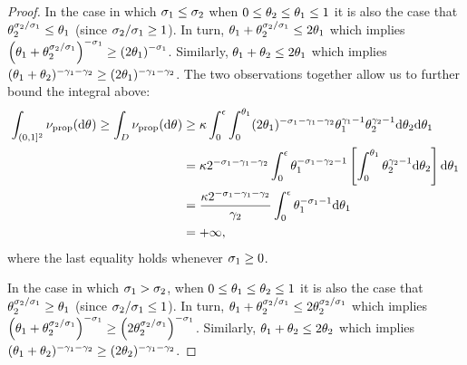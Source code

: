 \begin{proof}
    In the case in which $\sigma_{1} \le \sigma_{2}$  when $0\le\theta_{2} \le \theta_{1}\le1$ it is also the case that $\theta_{2}^{\sigma_{2}/\sigma_{1}}\le \theta_{1} $ (since $\sigma_{2}/\sigma_{1}\ge 1$). In turn,
    	$\theta_{1}+\theta_{2}^{\sigma_{2}/\sigma_{1}} \le 2 \theta_{1}$ which implies $\left( \theta_{1}+\theta_{2}^{\sigma_{2}/\sigma_{1}}  \right)^{-\sigma_{1}} \ge \left( 2 \theta_{1} \right)^{-\sigma_{1}}$. Similarly, $\theta_{1} + \theta_{2} \le 2 \theta_{1}$ which implies $(\theta_{1} + \theta_{2})^{-\gamma_{1}-\gamma_{2}} \ge (2\theta_{1})^{-\gamma_{1}-\gamma_{2}}$. The two observations together allow us to further bound the integral above:
	\begin{align*}
        \int_{(0,1]^2} \ratemeasproposed(\de\vecvariantfreq{}) \ge \int_D \ratemeasproposed(\de\vecvariantfreq{})&\ge \kappa \int_0^{\epsilon}\int_0^{\variantfreqperpop{1}} (2\variantfreqperpop{1})^{-\rate{1}-\corr{1}-\corr{2}}\variantfreqperpop{1}^{\corr{1}-1}\variantfreqperpop{2}^{\corr{2}-1} \de \variantfreqperpop{2} \de \variantfreqperpop{1} \\
        &= \kappa 2^{-\rate{1}-\corr{1}-\corr{2}} \int_0^{\epsilon} \variantfreqperpop{1}^{-\rate{1}-\corr{2}-1} \left[ \int_0^{\variantfreqperpop{1}} \variantfreqperpop{2}^{\corr{2}-1}\de \variantfreqperpop{2} \right] \de \variantfreqperpop{1} \\
        &=  \frac{\kappa 2^{-\rate{1}-\corr{1}-\corr{2}} }{\corr{2}} \int_0^{\epsilon}\variantfreqperpop{1}^{-\rate{1}-1} \de \variantfreqperpop{1} \\
        &= + \infty,
\end{align*}
where the last equality holds whenever $\sigma_{1} \ge 0$.

In the case in which $\sigma_{1} > \sigma_{2}$, when $0 \le \theta_{1}\le\theta_{2}\le1$ it is also the case that $\theta_{2}^{\sigma_{2}/\sigma_{1}}\ge \theta_{1} $ (since $\sigma_{2}/\sigma_{1}\le 1$). In turn,
$\theta_{1}+\theta_{2}^{\sigma_{2}/\sigma_{1}} \le 2 \theta_{2}^{\sigma_{2}/\sigma_{1}}$ which implies $\left( \theta_{1}+\theta_{2}^{\sigma_{2}/\sigma_{1}}  \right)^{-\sigma_{1}} \ge \left( 2 \theta_{2}^{\sigma_{2}/\sigma_{1}} \right)^{-\sigma_{1}}$. Similarly, $\theta_{1} + \theta_{2} \le 2 \theta_{2}$ which implies $(\theta_{1} + \theta_{2})^{-\gamma_{1}-\gamma_{2}} \ge (2\theta_{2})^{-\gamma_{1}-\gamma_{2}}$. 


\end{proof}
